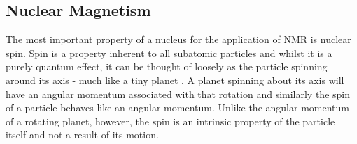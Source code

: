 \subsection{Nuclear Magnetism}
\label{sec:bg_nuclearmagnetism}

The most important property of a nucleus for the application of \ac{NMR} is nuclear spin. 
Spin is a property inherent to all subatomic particles and whilst it is a purely quantum effect, it can be thought of loosely as the particle spinning around its axis - much like a tiny planet \cite{Levitt2008}.
A planet spinning about its axis will have an angular momentum associated with that rotation and similarly the spin of a particle behaves like an angular momentum.
Unlike the angular momentum of a rotating planet, however, the spin is an intrinsic property of the particle itself and not a result of its motion\cite{Levitt2008}.


